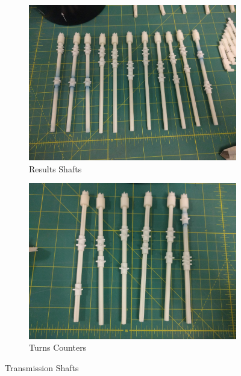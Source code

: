 \documentclass[openany]{book}
\begin{document}
\begin{figure}[!ht]
	\centering
	\begin{subfigure}{.4\textwidth}
		\centering
		\includegraphics[width=.95\textwidth]{images/image21.jpg}
		\caption{Results Shafts}
		\label{fig:image21}	
	\end{subfigure}
	\begin{subfigure}{.4\textwidth}
		\centering
		\includegraphics[width=.95\textwidth]{images/image40.jpg}
		\caption{Turns Counters}
		\label{fig:image40}	
	\end{subfigure}
	\caption{Transmission Shafts}
	\label{fig:transmission}
\end{figure}


\end{document}
